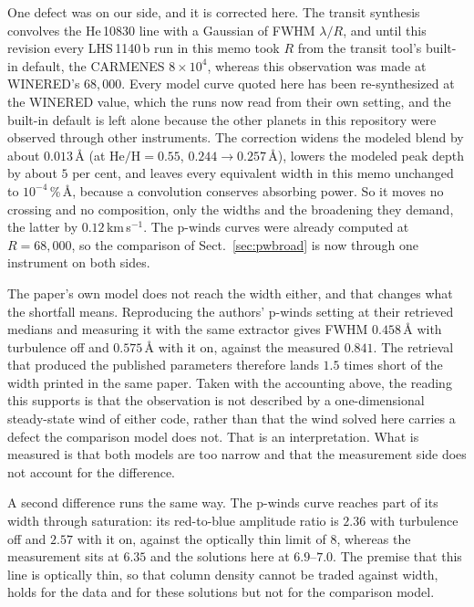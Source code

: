 \documentclass[english,a4paper]{my_memo}
\begin{document}
\medskip
\noindent One defect was on our side, and it is corrected here. The transit
synthesis convolves the He\,10830 line with a Gaussian of FWHM $\lambda/R$,
and until this revision every LHS\,1140\,b run in this memo took $R$ from the
transit tool's built-in default, the CARMENES $8\times10^{4}$, whereas this
observation was made at WINERED's $68{,}000$. Every model curve quoted here
has been re-synthesized at the WINERED value, which the runs now read from
their own setting, and the built-in default is left alone because the other
planets in this repository were observed through other instruments. The
correction widens the modeled blend by about $0.013$\,\AA{} (at
$\mathrm{He/H} = 0.55$, $0.244 \rightarrow 0.257$\,\AA{}), lowers the modeled
peak depth by about $5$ per cent, and leaves every equivalent width in this
memo unchanged to $10^{-4}$\,\%\,\AA, because a convolution conserves
absorbing power. So it moves no crossing and no composition, only the widths
and the broadening they demand, the latter by $0.12$\,km\,s$^{-1}$. The
p-winds curves were already computed at $R = 68{,}000$, so the comparison of
Sect.~\ref{sec:pwbroad} is now through one instrument on both sides.

\medskip
\noindent The paper's own model does not reach the width either, and that
changes what the shortfall means. Reproducing the authors' p-winds setting at
their retrieved medians and measuring it with the same extractor gives FWHM
$0.458$\,\AA{} with turbulence off and $0.575$\,\AA{} with it on, against the
measured $0.841$. The retrieval that produced the published parameters
therefore lands $1.5$ times short of the width printed in the same paper.
Taken with the accounting above, the reading this supports is that the
observation is not described by a one-dimensional steady-state wind of either
code, rather than that the wind solved here carries a defect the comparison
model does not. That is an interpretation. What is measured is that both
models are too narrow and that the measurement side does not account for the
difference.

A second difference runs the same way. The p-winds curve reaches part of its
width through saturation: its red-to-blue amplitude ratio is $2.36$ with
turbulence off and $2.57$ with it on, against the optically thin limit of
$8$, whereas the measurement sits at $6.35$ and the solutions here at
$6.9$--$7.0$. The premise that this line is optically thin, so that column
density cannot be traded against width, holds for the data and for these
solutions but not for the comparison model.
\end{document}
